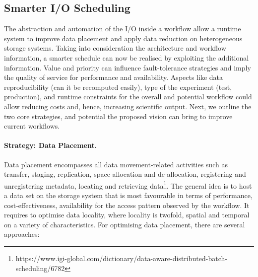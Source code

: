 \documentclass{superfri}
\begin{document}


\subsection{Smarter I/O Scheduling}

The abstraction and automation of the I/O inside a workflow allow a runtime system to improve data placement and apply data reduction on heterogeneous storage systems.
Taking into consideration the architecture and workflow information, a smarter schedule can now be realised by exploiting the additional information.
Value and priority can influence fault-tolerance strategies and imply the quality of service for performance and availability.
Aspects like data reproducibility (can it be recomputed easily), type of the experiment (test, production), and runtime constraints for the overall and potential workflow could allow reducing costs and, hence, increasing scientific output.
Next, we outline the two core strategies, and potential the proposed vision can bring to improve current workflows.


\paragraph{Strategy: Data Placement.}

Data placement encompasses all data movement-related activities such as transfer, staging, replication, space allocation and de-allocation, registering and unregistering metadata, locating and retrieving data\footnote{https://www.igi-global.com/dictionary/data-aware-distributed-batch-scheduling/6782}.
The general idea is to host a data set on the storage system that is most favourable in terms of performance, cost-effectiveness, availability for the access pattern observed by the workflow.
It requires to optimise data locality, where locality is twofold, spatial and temporal on a variety of characteristics.
For optimising data placement, there are several approaches:%
\end{document}
